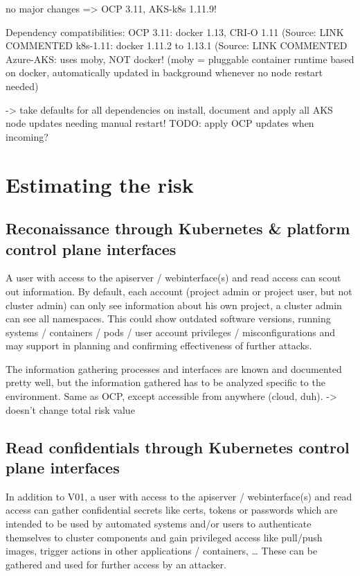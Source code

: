 no major changes => OCP 3.11, AKS-k8s 1.11.9!

Dependency compatibilities:
OCP 3.11: docker 1.13, CRI-O 1.11 (Source: LINK COMMENTED %
k8s-1.11: docker 1.11.2 to 1.13.1  (Source: LINK COMMENTED %
Azure-AKS: uses moby, NOT docker! (moby = pluggable container runtime based on docker, automatically updated in background whenever no node restart needed)

-> take defaults for all dependencies on install, document and apply all AKS node updates needing manual restart!
TODO: apply OCP updates when incoming?


\section{Estimating the risk}

\subsection{Reconaissance through Kubernetes \& platform control plane interfaces}

A user with access to the apiserver / webinterface(s) and read access can scout out information.
By default, each account (project admin or project user, but not cluster admin) can only see information about his own project, a cluster admin can see all namespaces.
This could show outdated software versions, running systems / containers / pods / user account privileges / misconfigurations and may support in planning and confirming effectiveness of further attacks.

The information gathering processes and interfaces are known and documented pretty well, but the information gathered has to be analyzed specific to the environment.
Same as OCP, except accessible from anywhere (cloud, duh).
-> doesn’t change total risk value

\subsection{Read confidentials through Kubernetes control plane interfaces}
In addition to V01, a user with access to the apiserver / webinterface(s) and read access can gather confidential secrets like certs, tokens or passwords which are intended to be used by automated systems and/or users to authenticate themselves to cluster components and gain privileged access like pull/push images, trigger actions in other applications / containers, …
These can be gathered and used for further access by an attacker.

